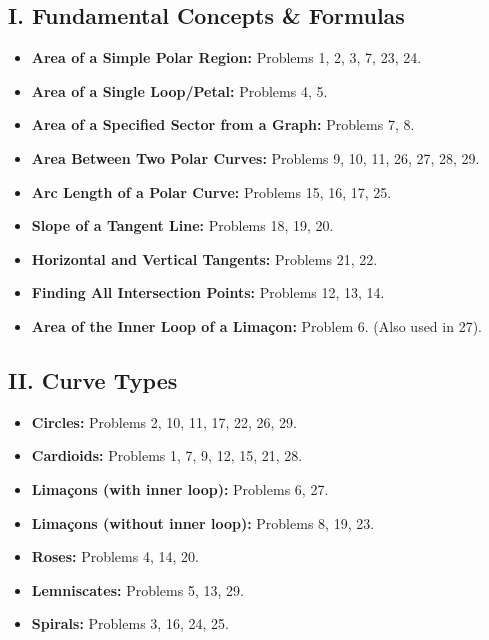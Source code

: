 \documentclass{article}
\begin{document}
\subsection*{I. Fundamental Concepts \& Formulas}
\begin{itemize}
    \item \textbf{Area of a Simple Polar Region:} Problems 1, 2, 3, 7, 23, 24.
    \item \textbf{Area of a Single Loop/Petal:} Problems 4, 5.
    \item \textbf{Area of a Specified Sector from a Graph:} Problems 7, 8.
    \item \textbf{Area Between Two Polar Curves:} Problems 9, 10, 11, 26, 27, 28, 29.
    \item \textbf{Arc Length of a Polar Curve:} Problems 15, 16, 17, 25.
    \item \textbf{Slope of a Tangent Line:} Problems 18, 19, 20.
    \item \textbf{Horizontal and Vertical Tangents:} Problems 21, 22.
    \item \textbf{Finding All Intersection Points:} Problems 12, 13, 14.
    \item \textbf{Area of the Inner Loop of a Limaçon:} Problem 6. (Also used in 27).
\end{itemize}

\subsection*{II. Curve Types}
\begin{itemize}
    \item \textbf{Circles:} Problems 2, 10, 11, 17, 22, 26, 29.
    \item \textbf{Cardioids:} Problems 1, 7, 9, 12, 15, 21, 28.
    \item \textbf{Limaçons (with inner loop):} Problems 6, 27.
    \item \textbf{Limaçons (without inner loop):} Problems 8, 19, 23.
    \item \textbf{Roses:} Problems 4, 14, 20.
    \item \textbf{Lemniscates:} Problems 5, 13, 29.
    \item \textbf{Spirals:} Problems 3, 16, 24, 25.
\end{itemize}
\end{document}
